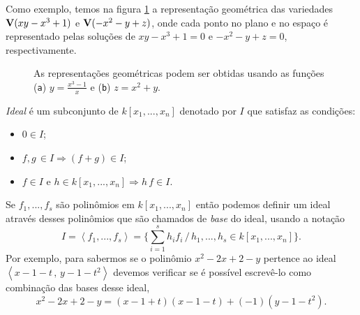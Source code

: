 Como exemplo, temos na figura \ref{fig.variedades} a representação geométrica das variedades ${\bf V}(xy-x^3+1)$ e ${\bf V}(-x^2-y+z)$, onde cada ponto no plano e no espaço é representado pelas soluções de $xy-x^3+1=0$ e $-x^2-y+z=0$, respectivamente.
\begin{figure}[!htb]
\centering
{}
\quad
{}
\caption{{As representações geométricas podem ser obtidas usando as funções ({\tt a}) $y=\frac{x^3-1}{x}$ e ({\tt b}) $z=x^2+y$}.}
\label{fig.variedades}
\end{figure} 

{\it Ideal} é um subconjunto de $k[x_1,...,x_n]$ denotado por $I$ que satisfaz as condições:
\begin{itemize}
\item $0\in I$;
\item $f,g\,\in I \Rightarrow (f+g)\in I$;
\item $f \in I$ e $h \in k[x_1,...,x_n] \Rightarrow h\,f \in I$. 
\end{itemize}

Se $f_1,...,f_s$ são polinômios em $k[x_1,...,x_n]$ então podemos definir um ideal através desses polinômios que são chamados de {\it base} do ideal, usando a notação
\begin{equation*}
I=\left\langle f_1,...,f_s \right\rangle = \{\sum_{i=1}^s h_if_i\,/\,h_1,...,h_s \in k[x_1,...,x_n]\}.
\end{equation*}
Por exemplo, para sabermos se o polinômio $x^2-2x+2-y$ pertence ao ideal $\left\langle x-1-t\,,\,y-1-t^2 \right\rangle$ devemos verificar se é possível escrevê-lo como combinação das bases desse ideal, 
\begin{equation*}
x^2-2x+2-y=(x-1+t)(x-1-t)+(-1)(y-1-t^2).
\end{equation*}

